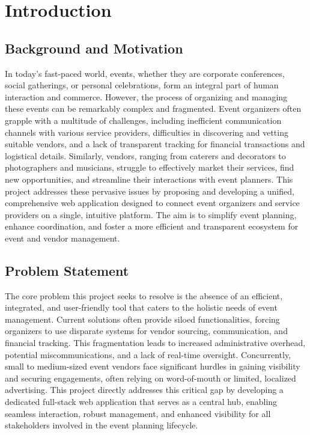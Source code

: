 \documentclass{report}
\begin{document}
\raggedright %

\chapter{Introduction}
\label{chap:introduction}

\section{Background and Motivation}
\label{sec:background_motivation}
In today's fast-paced world, events, whether they are corporate conferences, social gatherings, or personal celebrations, form an integral part of human interaction and commerce. However, the process of organizing and managing these events can be remarkably complex and fragmented. Event organizers often grapple with a multitude of challenges, including inefficient communication channels with various service providers, difficulties in discovering and vetting suitable vendors, and a lack of transparent tracking for financial transactions and logistical details. Similarly, vendors, ranging from caterers and decorators to photographers and musicians, struggle to effectively market their services, find new opportunities, and streamline their interactions with event planners. This project addresses these pervasive issues by proposing and developing a unified, comprehensive web application designed to connect event organizers and service providers on a single, intuitive platform. The aim is to simplify event planning, enhance coordination, and foster a more efficient and transparent ecosystem for event and vendor management.

\section{Problem Statement}
\label{sec:problem_statement}
The core problem this project seeks to resolve is the absence of an efficient, integrated, and user-friendly tool that caters to the holistic needs of event management. Current solutions often provide siloed functionalities, forcing organizers to use disparate systems for vendor sourcing, communication, and financial tracking. This fragmentation leads to increased administrative overhead, potential miscommunications, and a lack of real-time oversight. Concurrently, small to medium-sized event vendors face significant hurdles in gaining visibility and securing engagements, often relying on word-of-mouth or limited, localized advertising. This project directly addresses this critical gap by developing a dedicated full-stack web application that serves as a central hub, enabling seamless interaction, robust management, and enhanced visibility for all stakeholders involved in the event planning lifecycle.
\end{document}
